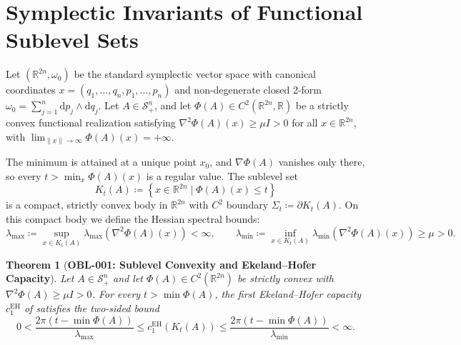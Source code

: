 \documentclass[11pt,a4paper,reqno]{amsart}
\newtheorem{theorem}{Theorem}[section]
\theoremstyle{definition}
\theoremstyle{remark}
\numberwithin{equation}{section}
\newcommand{\dif}{\mathrm{d}}
\begin{document}
\section{Symplectic Invariants of Functional Sublevel Sets}
\label{sec:symplectic}

Let $(\mathbb{R}^{2n}, \omega_0)$ be the standard symplectic vector space with canonical coordinates $x = (q_1, \dots, q_n, p_1, \dots, p_n)$ and non-degenerate closed 2-form $\omega_0 = \sum_{j=1}^n \dif p_j \wedge \dif q_j$. 
Let $A \in \mathcal{S}_+^n$, and let $\Phi(A) \in C^2(\mathbb{R}^{2n}, \mathbb{R})$ be a strictly convex functional realization satisfying $\nabla^2 \Phi(A)(x) \ge \mu I > 0$ for all $x \in \mathbb{R}^{2n}$, with $\lim_{\|x\| \to \infty} \Phi(A)(x) = +\infty$.

The minimum is attained at a unique point $x_0$, and $\nabla\Phi(A)$ vanishes only there, so every $t > \min_{x} \Phi(A)(x)$ is a regular value. The sublevel set
\begin{equation}
K_t(A) \coloneqq \left\{ x \in \mathbb{R}^{2n} \mid \Phi(A)(x) \le t \right\}
\end{equation}
is a compact, strictly convex body in $\mathbb{R}^{2n}$ with $C^2$ boundary $\Sigma_t \coloneqq \partial K_t(A)$. On this compact body we define the Hessian spectral bounds:
\begin{equation}
\lambda_{\max} \coloneqq \sup_{x \in K_t(A)} \lambda_{\max}\left(\nabla^2 \Phi(A)(x)\right) < \infty, \qquad \lambda_{\min} \coloneqq \inf_{x \in K_t(A)} \lambda_{\min}\left(\nabla^2 \Phi(A)(x)\right) \ge \mu > 0.
\end{equation}

\begin{theorem}[\textbf{OBL-001: Sublevel Convexity and Ekeland--Hofer Capacity}]
\label{thm:eh_capacity_pos}
Let $A \in \mathcal{S}_+^n$ and let $\Phi(A) \in C^2(\mathbb{R}^{2n})$ be strictly convex with $\nabla^2 \Phi(A) \ge \mu I > 0$. For every $t > \min \Phi(A)$, the first Ekeland--Hofer capacity $c_1^{\mathrm{EH}}$ of \cite{EkelandHofer1989,EkelandHofer1990} satisfies the two-sided bound
\begin{equation}
\label{eq:eh_bound}
0 < \frac{2\pi (t - \min \Phi(A))}{\lambda_{\max}} \le c_1^{\mathrm{EH}}(K_t(A)) \le \frac{2\pi (t - \min \Phi(A))}{\lambda_{\min}} < \infty.
\end{equation}
\end{theorem}
\end{document}
